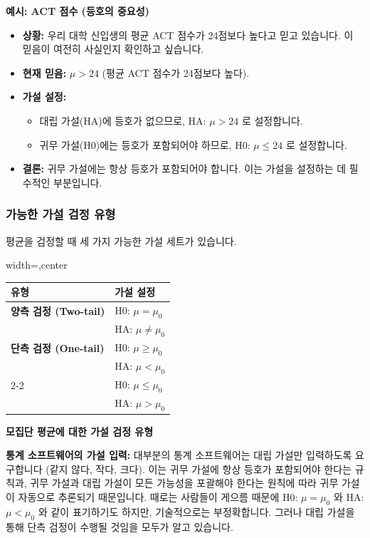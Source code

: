 \documentclass[11pt,a4paper]{book}
\providecommand{\captionof}[2]{\textbf{#2}}
\theoremstyle{definition}
\begin{document}
\begin{examplebox}
\textbf{예시: ACT 점수 (등호의 중요성)}
\begin{itemize}
    \item \textbf{상황:} 우리 대학 신입생의 평균 ACT 점수가 24점보다 높다고 믿고 있습니다. 이 믿음이 여전히 사실인지 확인하고 싶습니다.
    \item \textbf{현재 믿음:} $\mu > 24$ (평균 ACT 점수가 24점보다 높다).
    \item \textbf{가설 설정:}
        \begin{itemize}
            \item 대립 가설(HA)에 등호가 없으므로, HA: $\mu > 24$ 로 설정합니다.
            \item 귀무 가설(H0)에는 등호가 포함되어야 하므로, H0: $\mu \le 24$ 로 설정합니다.
        \end{itemize}
    \item \textbf{결론:} 귀무 가설에는 항상 등호가 포함되어야 합니다. 이는 가설을 설정하는 데 필수적인 부분입니다.
\end{itemize}
\end{examplebox}

\subsubsection*{가능한 가설 검정 유형}

평균을 검정할 때 세 가지 가능한 가설 세트가 있습니다.

\begin{adjustbox}{width=\textwidth,center}
\begin{tabular}{ll}
\toprule
\textbf{유형} & \textbf{가설 설정} \\
\midrule
\textbf{양측 검정 (Two-tail)} & H0: $\mu = \mu_0$ \\
& HA: $\mu \ne \mu_0$ \\
\midrule
\textbf{단측 검정 (One-tail)} & H0: $\mu \ge \mu_0$ \\
& HA: $\mu < \mu_0$ \\
\cmidrule{2-2}
& H0: $\mu \le \mu_0$ \\
& HA: $\mu > \mu_0$ \\
\bottomrule
\end{tabular}
\end{adjustbox}
\captionof{table}{모집단 평균에 대한 가설 검정 유형}
\label{tab:hypothesis_types}

\begin{cautionbox}
\textbf{통계 소프트웨어의 가설 입력:}
대부분의 통계 소프트웨어는 대립 가설만 입력하도록 요구합니다 (같지 않다, 작다, 크다).
이는 귀무 가설에 항상 등호가 포함되어야 한다는 규칙과, 귀무 가설과 대립 가설이 모든 가능성을 포괄해야 한다는 원칙에 따라 귀무 가설이 자동으로 추론되기 때문입니다.
때로는 사람들이 게으름 때문에 H0: $\mu = \mu_0$ 와 HA: $\mu < \mu_0$ 와 같이 표기하기도 하지만, 기술적으로는 부정확합니다. 그러나 대립 가설을 통해 단측 검정이 수행될 것임을 모두가 알고 있습니다.
\end{cautionbox}
\end{document}
